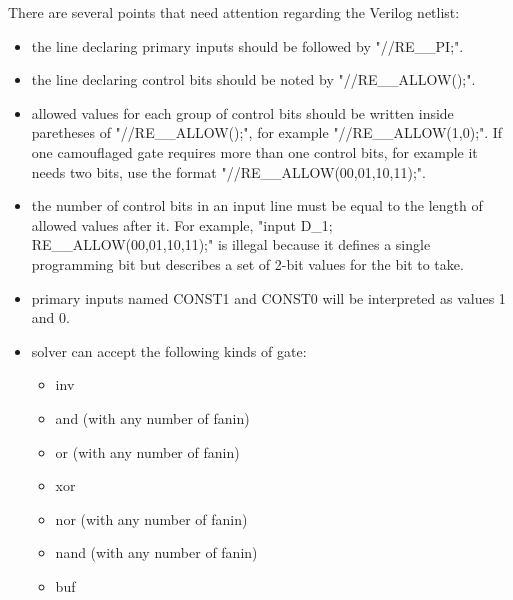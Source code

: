 \documentclass[thesis]{umassthesis}  %
\begin{document}
	There are several points that need attention regarding the Verilog netlist:
	\begin{itemize}

		\item the line declaring primary inputs should be followed by "\///RE\_\_PI;".
		\item the line declaring control bits should be noted by  "\///RE\_\_ALLOW();".
		\item allowed values for each group of control bits should be written inside paretheses of "\///RE\_\_ALLOW();", for example  "\///RE\_\_ALLOW(1,0);". If one camouflaged gate requires more than one control bits, for example it needs two bits, use the format  "\///RE\_\_ALLOW(00,01,10,11);".
		\item the number of control bits in an input line must be equal to the length of allowed values after it. For example, "input D\_1; RE\_\_ALLOW(00,01,10,11);" is illegal because it defines a single programming bit but describes a set of 2-bit values for the bit to take.
		\item primary inputs named CONST1 and CONST0 will be interpreted as values 1 and 0.
		\item solver can accept the following kinds of gate:
			\begin{itemize}
				\item inv
				\item and (with any number of fanin) 
				\item or (with any number of fanin)
				\item xor 
				\item nor (with any number of fanin)
				\item nand (with any number of fanin)
				\item buf
			\end{itemize}
	\end{itemize}
	\clearpage
\end{document}
